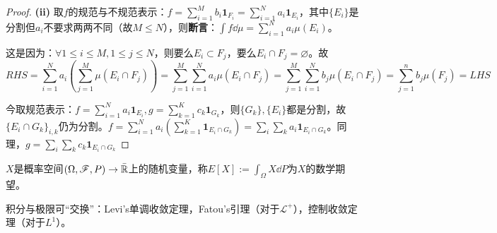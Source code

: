 \documentclass{ctexart}
\begin{document}
\begin{proof}
  \textbf{(ii)} 取$f$的规范与不规范表示：$f=\sum_{i=1}^{M}b_{i}\bm 1_{F_{i}}=\sum_{i=1}^{N}a_{i}\bm 1_{E_{i}}$，其中$\{E_{i}\}$是分割但$a_{i}$不要求两两不同（故$M\leq N$），则\textbf{断言}：$\int f\dd\mu=\sum_{i=1}^{N}a_{i}\mu(E_{i})$。

  这是因为：$\forall 1\leq i\leq M,1\leq j\leq N$，则要么$E_{i}\subset F_{j}$，要么$E_{i}\cap F_{j}=\varnothing$。故
  \[RHS=\sum_{i=1}^{N}a_{i}(\sum_{j=1}^{M}\mu(E_{i}\cap F_{j}))=\sum_{j=1}^{M}\sum_{i=1}^{N}a_{i}\mu(E_{i}\cap F_{j})=\sum_{j=1}^{M}\sum_{i=1}^{N}b_{j}\mu(E_{i}\cap F_{j})=\sum_{j=1}^{n}b_{j}\mu(F_{j})=LHS\]

    今取规范表示：$f=\sum_{i=1}^{N}a_{i}\bm{1}_{E_{i}},g=\sum_{k=1}^{K}c_{k}\bm{1}_{G_{k}}$，则$\{G_{k}\},\{E_{i}\}$都是分割，故$\{E_{i}\cap G_{k}\}_{i,k}$仍为分割。$f=\sum_{i=1}^{N}a_{i}(\sum_{k=1}^{K}\bm{1}_{E_{i}\cap G_{k}})=\sum_{i}\sum_{k}a_{i}\bm 1_{E_{i}\cap G_{k}}$。同理，$g=\sum_{i}\sum_{k}c_{k}\bm{1}_{E_{i}\cap G_{k}}$
\end{proof}
\begin{Def}
$X$是概率空间$(\Omega,\mathscr{F},P)\to\bar{\mathbb{R}}$上的随机变量，称$E[X]:=\int_{\Omega}X\dd P$为$X$的数学期望。
\end{Def}

\begin{Rmk}
  积分与极限可“交换”：Levi's单调收敛定理，Fatou's引理（对于$\mathcal{L}^{+}$），控制收敛定理（对于$L^{1}$）。
\end{Rmk}
\end{document}
